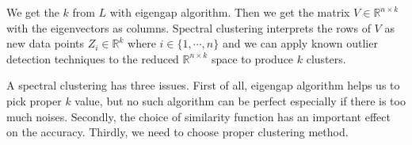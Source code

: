 We get the $k$ from $L$ with eigengap algorithm. 
Then we get the matrix $V \in \mathbb{R}^{n \times k}$ with the eigenvectors as columns.
Spectral clustering interprets the rows of $V$ as new data points $Z_i \in \mathbb{R}^k$ where $i \in \{1, \cdots, n\}$ 
and we can apply known outlier detection techniques \cite{knorr00} to the reduced $\mathbb{R}^{n \times k}$ space to produce $k$ clusters. 

A spectral clustering has three issues. 
First of all, eigengap algorithm helps us to pick proper $k$ value, but no such algorithm can be perfect especially if there is too much noises. 
Secondly, the choice of similarity function has an important effect on the accuracy. 
Thirdly, we need to choose proper clustering method. 

